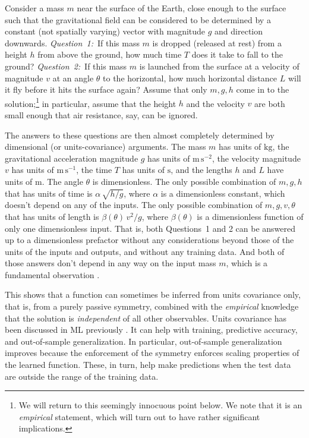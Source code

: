 \documentclass[preprint]{article} %
\newcommand{\unit}[1]{\mathrm{#1}}
\newcommand{\kg}{\unit{kg}}
\newcommand{\m}{\unit{m}}
\newcommand{\s}{\unit{s}}
\begin{document}
Consider a mass $m$ near the surface of the Earth, close enough to the surface such that the gravitational field can be considered to be determined by a constant (not spatially varying) vector with magnitude $g$ and direction downwards.
\textsl{Question~1:}~If this mass $m$ is dropped (released at rest) from a height $h$ from above the ground, how much time $T$ does it take to fall to the ground?
\textsl{Question~2:}~If this mass $m$ is launched from the surface at a velocity of magnitude $v$ at an angle $\theta$ to the horizontal, how much horizontal distance $L$ will it fly before it hits the surface again?
Assume that only $m, g, h$ come in to the solution;\footnote{We will return to this seemingly innocuous point below. We note that it is an \emph{empirical} statement, which will turn out to have rather significant implications.} in particular, assume that the height $h$ and the velocity $v$ are both small enough that air resistance, say, can be ignored.

The answers to these questions are then almost completely determined by dimensional (or units-covariance) arguments.
The mass $m$ has units of $\kg$, the gravitational acceleration magnitude $g$ has units of $\m\,\s^{-2}$, the velocity magnitude $v$ has units of $\m\,\s^{-1}$, the time $T$ has units of $\s$, and the lengths $h$ and $L$ have units of $\m$.
The angle $\theta$ is dimensionless.
The only possible combination of $m, g, h$ that has units of time is $\alpha\,\sqrt{h/g}$, where $\alpha$ is a dimensionless constant, which doesn't depend on any of the inputs.
The only possible combination of $m, g, v, \theta$ that has units of length is $\beta(\theta)\,v^2/g$, where $\beta(\theta)$ is a dimensionless function of only one dimensionless input.
That is, both Questions~1 and 2 can be answered up to a dimensionless prefactor without any considerations beyond those of the units of the inputs and outputs, and without any training data.
And both of those answers don't depend in any way on the input mass $m$, which is a fundamental observation \citep{gr}.

This shows that a function can sometimes be inferred from units covariance only, that is, from a purely passive symmetry, combined with the \emph{empirical} knowledge that the solution is \emph{independent} of all other observables.
Units covariance has been discussed in ML previously \citep{villar2022dimensionless, bakarji2022dimensionally, xie2022data}.
It can help with training, predictive accuracy, and out-of-sample generalization.
In particular, out-of-sample generalization improves because the enforcement of the symmetry enforces scaling properties of the learned function.
These, in turn, help make predictions when the test data are outside the range of the training data.
\end{document}
